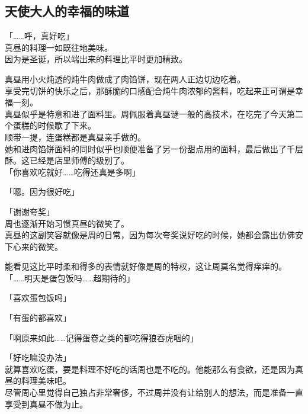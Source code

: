\subsection{天使大人的幸福的味道}

「……呼，真好吃」\\

真昼的料理一如既往地美味。\\

因为是圣诞，所以端出来的料理比平时更加精致。

真昼用小火炖透的炖牛肉做成了肉馅饼，现在两人正边切边吃着。\\

享受完切饼的快乐之后，那酥脆的口感配合炖牛肉浓郁的酱料，吃起来正可谓是幸福一刻。\\

真昼似乎是特意和进了面料里。周佩服着真昼谜一般的高技术，在吃完了今天第二个蛋糕的时候歇了下来。\\

顺带一提，连蛋糕都是真昼亲手做的。\\

她和进肉馅饼面料的同时似乎也顺便准备了另一份甜点用的面料，最后做出了千层酥。这已经是店里师傅的级别了。\\

「你喜欢吃就好……吃得还真是多啊」

「嗯。因为很好吃」

「谢谢夸奖」\\

周也逐渐开始习惯真昼的微笑了。\\

真昼的这副笑容就像是周的日常，因为每次夸奖说好吃的时候，她都会露出仿佛安下心来的微笑。

能看见这比平时柔和得多的表情就好像是周的特权，这让周莫名觉得痒痒的。\\

「……明天是蛋包饭吗……超期待的」

「喜欢蛋包饭吗」

「有蛋的都喜欢」

「啊原来如此……记得蛋卷之类的都吃得狼吞虎咽的」

「好吃嘛没办法」\\

就算喜欢吃蛋，要是料理不好吃的话周也是不吃的。他能那么有食欲，还是因为真昼的料理美味吧。\\

尽管周心里觉得自己独占非常奢侈，不过周并没有让给别人的想法，而是准备一直享受到真昼不做为止。\\

